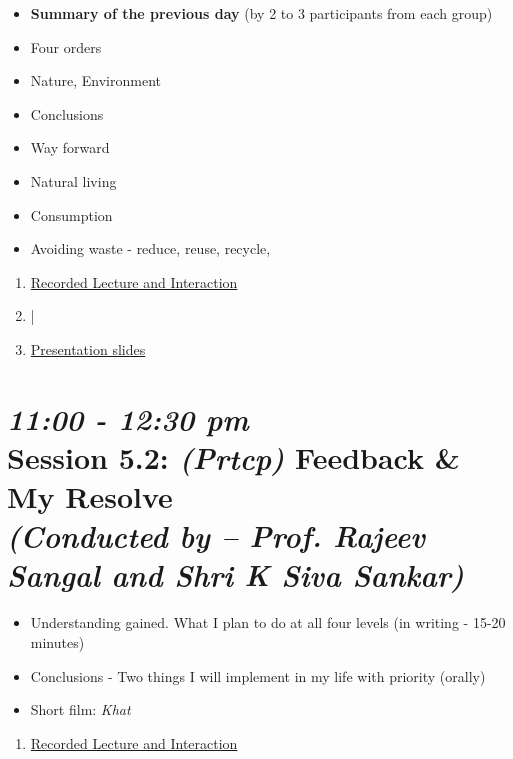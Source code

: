 \documentclass[11pt]{article}
\begin{document}

    \begin{itemize}
        \item {\bf Summary of the previous day} (by 2 to 3 participants from each group)
        \item Four orders
        \item Nature, Environment
        \item Conclusions
        \item Way forward
    \end{itemize}
    \begin{itemize}
        \item Natural living
        \item Consumption
        \item Avoiding waste - reduce, reuse,  recycle,
    \end{itemize}

    \begin{enumerate}
        \item \href{https://www.youtube.com/watch?v=rtB5y69PeDk}{Recorded Lecture and Interaction}
        \item |
        \item \href{presentations/day4/harmony_in_nature.pdf}{Presentation slides}
    \end{enumerate}

    \section*{{\it 11:00 - 12:30 pm} \\
    Session 5.2: {\it (Prtcp)} Feedback \& My Resolve \\
    {\Large\it (Conducted by -- Prof. Rajeev Sangal and Shri K Siva Sankar)}}

    \begin{itemize}
        \item Understanding gained. What I plan to do at all four levels (in writing - 15-20 minutes)
        \item Conclusions - Two things I will implement in my life with priority (orally)
        \item Short film: {\em Khat}
    \end{itemize}

    \begin{enumerate}
        \item \href{https://www.youtube.com/watch?v=9KMKcNSl0So}{Recorded Lecture and Interaction}
    \end{enumerate}
\end{document}
